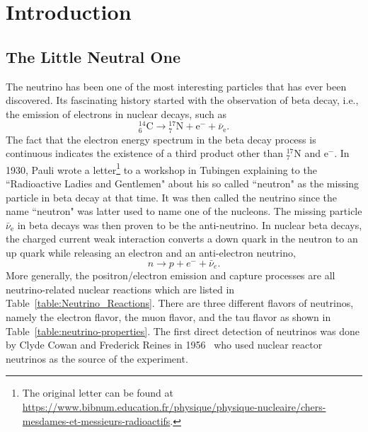 \chapter{Introduction}
\label{introduction}

\section{The Little Neutral One}

The neutrino has been one of the most interesting particles that has ever been discovered. Its fascinating history started with the observation of beta decay, i.e., the emission of electrons in nuclear decays, such as
\begin{equation*}
{}^{14}_{6} \mathrm C \to {}^{17}_{7}\mathrm N + \mathrm e^{-} + \bar\nu_{\mathrm e}.
\end{equation*}
The fact that the electron energy spectrum in the beta decay process is continuous indicates the existence of a third product other than ${}^{17}_{7}\mathrm N$ and $\mathrm e^-$. In 1930, Pauli wrote a letter\footnote{The original letter can be found at \url{https://www.bibnum.education.fr/physique/physique-nucleaire/chers-mesdames-et-messieurs-radioactifs}.} to a workshop in Tubingen explaining to the ``Radioactive Ladies and Gentlemen" about his so called ``neutron" as the missing particle in beta decay at that time. It was then called the neutrino since the name ``neutron" was latter used to name one of the nucleons. The missing particle $\bar\nu_{\mathrm e}$ in beta decays was then proven to be the anti-neutrino. In nuclear beta decays, the charged current weak interaction converts a down quark in the neutron to an up quark while releasing an electron and an anti-electron neutrino,
\begin{equation}
n\to p + e^- + \bar \nu_e .
\end{equation}
More generally, the positron/electron emission and capture processes are all neutrino-related nuclear reactions which are listed in Table~\ref{table:Neutrino_Reactions}. There are three different flavors of neutrinos, namely the electron flavor, the muon flavor, and the tau flavor as shown in Table~\ref{table:neutrino-properties}. The first direct detection of neutrinos was done by Clyde Cowan and Frederick Reines in 1956~\cite{Cowan1956} who used nuclear reactor neutrinos as the source of the experiment.

